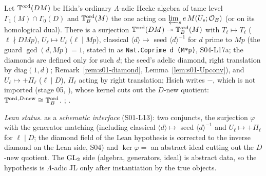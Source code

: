 \begin{theorem}\label{thm:s01-lambdaJL}
Let $\mathbb{T}^{\mathrm{ord}}(DM)$ be Hida's ordinary $\Lambda$-adic Hecke algebra of tame level $\Gamma_1(M)\cap\Gamma_0(D)$ and
$\mathbb{T}^{\mathrm{ord}}_B(M)$ the one acting on $\varprojlim_se\,M(U_s;\mathcal{O}_E)$ (or on its homological dual). There is a surjection
$\mathbb{T}^{\mathrm{ord}}(DM)\twoheadrightarrow\mathbb{T}^{\mathrm{ord}}_B(M)$ with $T_\ell\mapsto T_\ell$ ($\ell\nmid DMp$), $U_\ell\mapsto U_\ell$ ($\ell\mid Mp$),
classical $\langle d\rangle\mapsto$ seed $\langle d\rangle^{-1}$ for $d$ prime to $Mp$ (the guard $\gcd(d,Mp)=1$, stated in  as \texttt{Nat.Coprime d (M*p)}, S04-L17a; the diamonds are defined only for such $d$; the seed's adelic diamond, right translation by $\mathrm{diag}(1,d)$; Remark~\ref{rem:s01-diamond}, Lemma~\ref{lem:s01-Upconv}), and $U_\ell\mapsto+\Pi_\ell$ ($\ell\mid D$), $\Pi_\ell$ acting by right translation; Hsieh writes $-$, which is not imported (stage 05, ),
whose kernel cuts out the
$D$-new quotient: $\mathbb{T}^{\mathrm{ord},D\text{-new}}\cong\mathbb{T}^{\mathrm{ord}}_B$.
\stcited{} ; .
\end{theorem}
\noindent\emph{Lean status.}  \stformal{} as a \emph{schematic interface} (S01-L13): two conjuncts, the surjection
$\varphi$ with the generator matching (including classical $\langle d\rangle\mapsto$ seed $\langle d\rangle^{-1}$ and $U_\ell\mapsto+\Pi_\ell$ for $\ell\mid D$; the diamond field of the Lean hypothesis is corrected to the inverse diamond on the Lean side, S04) and $\ker\varphi=$ an abstract ideal cutting out the $D$-new
quotient. The $\mathrm{GL}_2$ side (algebra, generators, ideal) is abstract data, so the hypothesis is $\Lambda$-adic JL only after instantiation by the true objects.


